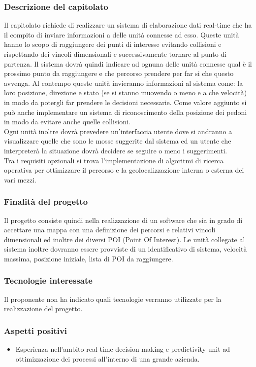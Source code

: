 		\subsubsection{Descrizione del capitolato}
			Il capitolato richiede di realizzare un sistema di elaborazione dati real-time che ha il compito di inviare informazioni a delle unità connesse ad esso. Queste unità hanno lo scopo di raggiungere dei punti di interesse evitando collisioni e rispettando dei vincoli dimensionali e successivamente tornare al punto di partenza. Il sistema dovrà quindi indicare ad ognuna delle unità connesse qual è il prossimo punto da raggiungere e che percorso prendere per far si che questo avvenga. Al contempo queste unità invieranno informazioni al sistema come: la loro posizione, direzione e stato (se si stanno muovendo o meno e a che velocità) in modo da potergli far prendere le decisioni necessarie. Come valore aggiunto si può anche implementare un sistema di riconoscimento della posizione dei pedoni in modo da evitare anche quelle collisioni. \\
			Ogni unità inoltre dovrà prevedere un’interfaccia utente dove si andranno a visualizzare quelle che sono le mosse suggerite dal sistema ed un utente che interpreterà la situazione dovrà decidere se seguire o meno i suggerimenti. \\
			Tra i requisiti opzionali si trova l’implementazione di algoritmi di ricerca operativa per ottimizzare il percorso e la geolocalizzazione interna o esterna dei vari mezzi.\\
		\subsubsection{Finalità del progetto}
			Il progetto consiste quindi nella realizzazione di un software che sia in grado di accettare una mappa con una definizione dei percorsi e relativi vincoli dimensionali ed inoltre dei diversi POI (Point Of Interest). Le unità collegate al sistema inoltre dovranno essere provviste di un identificativo di sistema, velocità massima, posizione iniziale, lista di POI da raggiungere.
		\subsubsection{Tecnologie interessate}
			Il proponente non ha indicato quali tecnologie verranno utilizzate per la realizzazione del progetto.
			
		\subsubsection{Aspetti positivi}
			\begin{itemize}
				\item Esperienza nell’ambito real time decision making e predictivity unit ad ottimizzazione dei processi all’interno di una grande azienda.
 			\end{itemize}			
